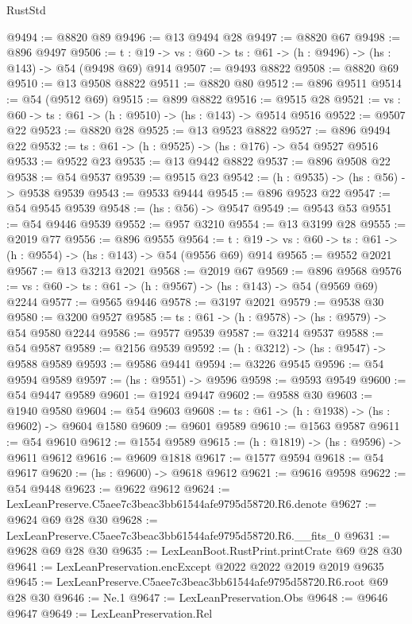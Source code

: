 \begin{lexlean}{RustStd}
\begin{coremodule}
@9494 := @8820 @89
@9496 := @13 @9494 @28
@9497 := @8820 @67
@9498 := @896 @9497
@9506 := {t : @19} -> {vs : @60} -> {ts : @61} -> (h : @9496) -> (hs : @143) -> @54 (@9498 @69) @914
@9507 := @9493 @8822
@9508 := @8820 @69
@9510 := @13 @9508 @8822
@9511 := @8820 @80
@9512 := @896 @9511
@9514 := @54 (@9512 @69)
@9515 := @899 @8822
@9516 := @9515 @28
@9521 := {vs : @60} -> {ts : @61} -> (h : @9510) -> (hs : @143) -> @9514 @9516
@9522 := @9507 @22
@9523 := @8820 @28
@9525 := @13 @9523 @8822
@9527 := @896 @9494 @22
@9532 := {ts : @61} -> (h : @9525) -> (hs : @176) -> @54 @9527 @9516
@9533 := @9522 @23
@9535 := @13 @9442 @8822
@9537 := @896 @9508 @22
@9538 := @54 @9537
@9539 := @9515 @23
@9542 := (h : @9535) -> (hs : @56) -> @9538 @9539
@9543 := @9533 @9444
@9545 := @896 @9523 @22
@9547 := @54 @9545 @9539
@9548 := (hs : @56) -> @9547
@9549 := @9543 @53
@9551 := @54 @9446 @9539
@9552 := @957 @3210
@9554 := @13 @3199 @28
@9555 := @2019 @77
@9556 := @896 @9555
@9564 := {t : @19} -> {vs : @60} -> {ts : @61} -> (h : @9554) -> (hs : @143) -> @54 (@9556 @69) @914
@9565 := @9552 @2021
@9567 := @13 @3213 @2021
@9568 := @2019 @67
@9569 := @896 @9568
@9576 := {vs : @60} -> {ts : @61} -> (h : @9567) -> (hs : @143) -> @54 (@9569 @69) @2244
@9577 := @9565 @9446
@9578 := @3197 @2021
@9579 := @9538 @30
@9580 := @3200 @9527
@9585 := {ts : @61} -> (h : @9578) -> (hs : @9579) -> @54 @9580 @2244
@9586 := @9577 @9539
@9587 := @3214 @9537
@9588 := @54 @9587
@9589 := @2156 @9539
@9592 := (h : @3212) -> (hs : @9547) -> @9588 @9589
@9593 := @9586 @9441
@9594 := @3226 @9545
@9596 := @54 @9594 @9589
@9597 := (hs : @9551) -> @9596
@9598 := @9593 @9549
@9600 := @54 @9447 @9589
@9601 := @1924 @9447
@9602 := @9588 @30
@9603 := @1940 @9580
@9604 := @54 @9603
@9608 := {ts : @61} -> (h : @1938) -> (hs : @9602) -> @9604 @1580
@9609 := @9601 @9589
@9610 := @1563 @9587
@9611 := @54 @9610
@9612 := @1554 @9589
@9615 := (h : @1819) -> (hs : @9596) -> @9611 @9612
@9616 := @9609 @1818
@9617 := @1577 @9594
@9618 := @54 @9617
@9620 := (hs : @9600) -> @9618 @9612
@9621 := @9616 @9598
@9622 := @54 @9448
@9623 := @9622 @9612
@9624 := LexLeanPreserve.C5aee7c3beac3bb61544afe9795d58720.R6.denote
@9627 := @9624 @69 @28 @30
@9628 := LexLeanPreserve.C5aee7c3beac3bb61544afe9795d58720.R6.__fits_0
@9631 := @9628 @69 @28 @30
@9635 := LexLeanBoot.RustPrint.printCrate @69 @28 @30
@9641 := LexLeanPreservation.encExcept @2022 @2022 @2019 @2019 @9635
@9645 := LexLeanPreserve.C5aee7c3beac3bb61544afe9795d58720.R6.root @69 @28 @30
@9646 := Ne.{1}
@9647 := LexLeanPreservation.Obs
@9648 := @9646 @9647
@9649 := LexLeanPreservation.Rel

\end{coremodule}
\end{lexlean}
